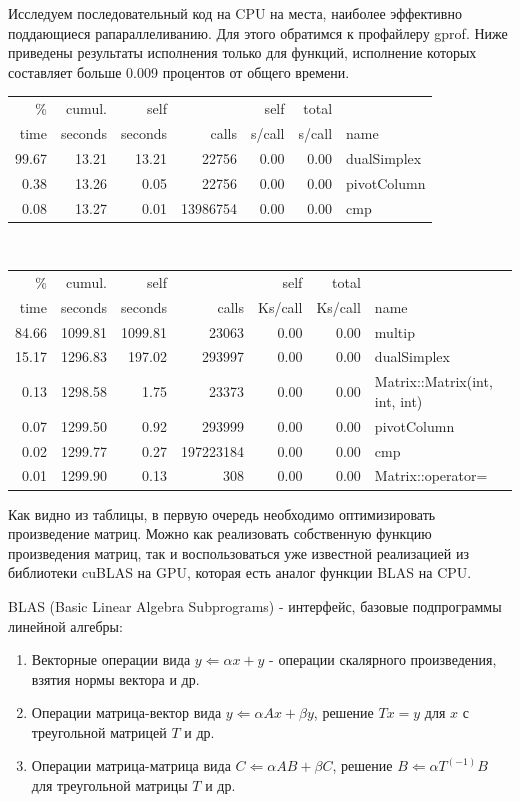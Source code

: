 \documentclass[a4paper,14pt,russian]{extreport}
\begin{document}
Исследуем последовательный код на CPU на места, наиболее эффективно поддающиеся рапараллеливанию. Для этого обратимся к профайлеру gprof. Ниже приведены результаты исполнения только для функций, исполнение которых составляет больше 0.009 процентов от общего времени.
\\
\begin{tabular}{rrrrrrp{3cm}}
  \% &  cumul. &  self    & &         self  &   total    \\       
 time  & seconds &  seconds  &  calls &  s/call &  s/call & name    \\
 99.67  &   13.21  &  13.21 &   22756 &    0.00 &    0.00 & dualSimplex\\
  0.38  &   13.26  &   0.05  &  22756 &    0.00  &   0.00 & pivotColumn\\
  0.08   &  13.27 &    0.01 & 13986754 &    0.00 &    0.00 &  cmp\\
\end{tabular}
\\
\begin{tabular}{rrrrrrp{3cm}}
  \% &  cumul. &  self  &          &  self  &   total    & \\       
 time  & seconds  & seconds  &  calls & Ks/call & Ks/call &  name  \\  
 84.66 &  1099.81 & 1099.81 &   23063 &    0.00  &   0.00 & multip\\
 15.17 &  1296.83 &  197.02  & 293997  &   0.00  &   0.00 & dualSimplex\\
  0.13 &  1298.58  &   1.75  &  23373  &   0.00  &   0.00 & Matrix::Matrix(int, int, int)\\
  0.07 &  1299.50  &   0.92 &  293999  &   0.00  &   0.00 & pivotColumn\\
  0.02 &  1299.77  &   0.27 & 197223184  &   0.00 &    0.00 & cmp\\
  0.01 &  1299.90  &   0.13  &    308   &  0.00  &   0.00 & Matrix::operator=\\
\end{tabular}
\par
Как видно из таблицы, в первую очередь необходимо оптимизировать произведение матриц. Можно как реализовать собственную функцию произведения матриц, так и воспользоваться уже известной реализацией из библиотеки cuBLAS на GPU, которая есть аналог функции BLAS на CPU. 
\par
BLAS (Basic Linear Algebra Subprograms) - интерфейс, базовые подпрограммы линейной алгебры:
\begin{enumerate}
\item Векторные операции вида $y\Leftarrow\alpha x + y$ - операции скалярного произведения, взятия нормы вектора и др.
\item Операции матрица-вектор вида $y\Leftarrow\alpha Ax + \beta y$, решение $Tx = y$ для $x$ с треугольной матрицей $T$ и др.
\item Операции матрица-матрица вида $C\Leftarrow \alpha AB + \beta C$, решение $B\Leftarrow \alpha T^(-1)B$ для треугольной матрицы $T$ и др.
\end{enumerate}
\end{document}
